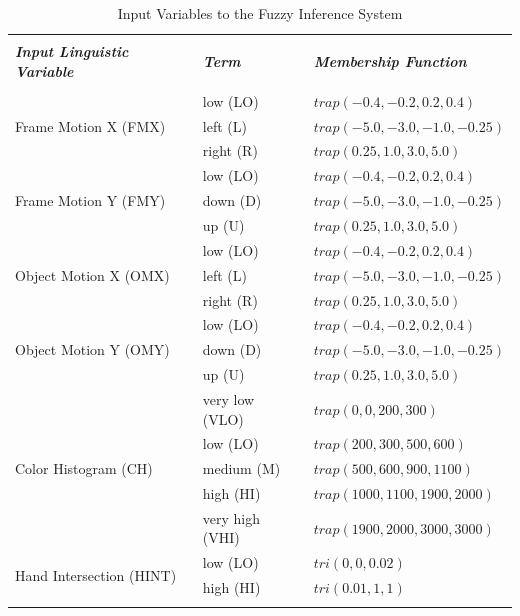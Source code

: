 \documentclass[12pt]{report}
\begin{document}
\begin{table}
\caption{Input Variables to the Fuzzy Inference System}
\begin{center}
\begin{tabular}{p{2cm}ll}
\hline \\
\textbf{\textit{Input Linguistic Variable}}&\textbf{\textit{Term}}&\textbf{\textit{Membership Function}} \\
\hline
\hline \\
\multirow{3}{2cm}{Frame Motion X (FMX)} & low (LO) & $trap(-0.4, -0.2, 0.2, 0.4)$ \\
 & left (L) & $trap(-5.0, -3.0, -1.0, -0.25)$ \\
 & right (R) & $trap(0.25, 1.0, 3.0, 5.0)$ \\
\hline
\multirow{3}{2cm}{Frame Motion Y (FMY)} & low (LO) & $trap(-0.4, -0.2, 0.2, 0.4)$ \\
 & down (D) & $trap(-5.0, -3.0, -1.0, -0.25)$ \\
 & up (U) & $trap(0.25, 1.0, 3.0, 5.0)$ \\
\hline
\multirow{3}{2cm}{Object Motion X (OMX)} & low (LO) & $trap(-0.4, -0.2, 0.2, 0.4)$ \\
 & left (L) & $trap(-5.0, -3.0, -1.0, -0.25)$ \\
 & right (R) & $trap(0.25, 1.0, 3.0, 5.0)$ \\
\hline
\multirow{3}{2cm}{Object Motion Y (OMY)} & low (LO) & $trap(-0.4, -0.2, 0.2, 0.4)$ \\
 & down (D) & $trap(-5.0, -3.0, -1.0, -0.25)$ \\
 & up (U) & $trap(0.25, 1.0, 3.0, 5.0)$ \\
\hline
\multirow{5}{2cm}{Color Histogram (CH)} & very low (VLO) & $trap(0, 0, 200, 300)$ \\
 & low (LO) & $trap(200, 300, 500, 600)$ \\
 & medium (M) & $trap(500, 600, 900, 1100)$ \\
 & high (HI) & $trap(1000, 1100, 1900, 2000)$ \\
 & very high (VHI) & $trap(1900, 2000, 3000, 3000)$ \\
 \hline
 \multirow{2}{2cm}{Hand Intersection (HINT)} & low (LO) & $tri(0, 0, 0.02)$ \\
 & high (HI) & $tri(0.01, 1, 1)$ \\ \\
\hline
\end{tabular}
\label{inputFeatures}
\end{center}
\end{table}
\end{document}
